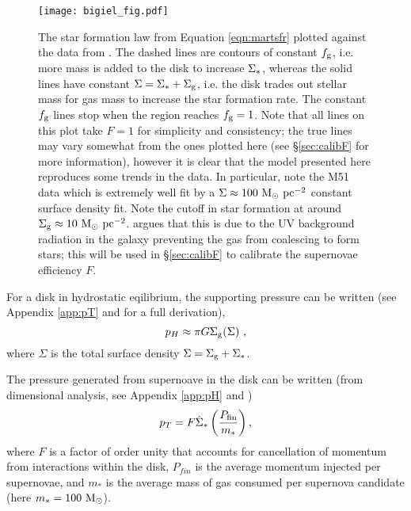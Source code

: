 \begin{figure}
    \centering
    \texttt{[image: bigiel\_fig.pdf]}
    \caption{The star formation law from Equation \ref{eqn:martsfr} plotted against the data from \citet{bigiel_star_2008}. The dashed lines are contours of constant $f_\mathrm{g}$, i.e. more mass is added to the disk to increase $\Sigma_*$, whereas the solid lines have constant $\Sigma = \Sigma_* + \Sigma_\mathrm{g}$, i.e. the disk trades out stellar mass for gas mass to increase the star formation rate. The constant $f_\mathrm{g}$ lines stop when the region reaches $f_\mathrm{g}=1$. Note that all lines on this plot take $F=1$ for simplicity and consistency; the true lines may vary somewhat from the ones plotted here (see \S \ref{sec:calibF} for more information), however it is clear that the model presented here reproduces some trends in the data. In particular, note the M51 data which is extremely well fit by a $\Sigma \approx 100 ~\mathrm{M}_{\odot} ~\mathrm{pc}^{-2}$ constant surface density fit. Note the cutoff in star formation at around $\Sigma_\mathrm{g} \approx 10 ~\mathrm{M}_{\odot} ~\mathrm{pc}^{-2}$. \citet{schaye_star_2004} argues that this is due to the UV background radiation in the galaxy preventing the gas from coalescing to form stars; this will be used in \S \ref{sec:calibF} to calibrate the supernovae efficiency $F$.}
    \label{fig:bigielwithmart}
\end{figure}

For a disk in hydrostatic eqilibrium, the supporting pressure can be written (see Appendix \ref{app:pT} and \citet{ostriker_maximally_2011} for a full derivation),
\begin{equation}
\label{eqn:hydeq}
p_H \approx \pi G \Sigma_\mathrm{g} (\Sigma)~,
\end{equation}
where $\Sigma$ is the total surface density $\Sigma = \Sigma_\mathrm{g} + \Sigma_*$.

The pressure generated from supernoave in the disk can be written (from dimensional analysis, see Appendix \ref{app:pH} and \citet{martizzi_supernova_2015})
\begin{equation}
\label{eqn:turb}
p_T = F \dot{\Sigma}_* \left(\frac{P_\mathrm{fin}}{m_*}\right),
\end{equation}
where $F$ is a factor of order unity that accounts for cancellation of momentum from interactions within the disk, $P_{fin}$ is the average momentum injected per supernovae, and $m_*$ is the average mass of gas consumed per supernova candidate (here $m_* = 100 ~\mathrm{M}_{\odot}$).

